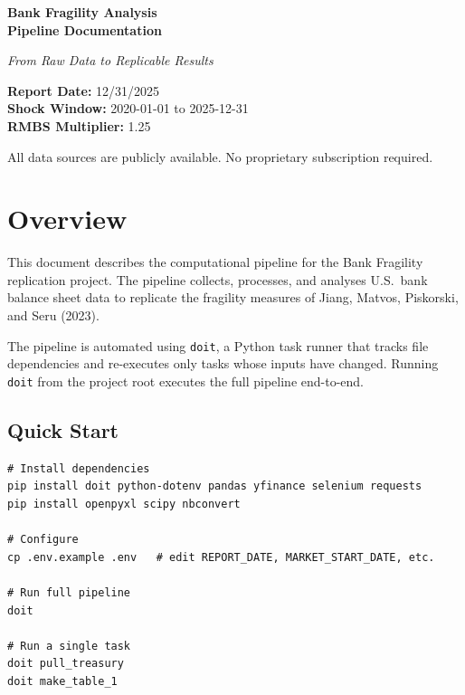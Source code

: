 \documentclass[12pt, a4paper]{article}
\begin{document}
\begin{titlepage}
    \centering
    \vspace*{2cm}
    {\LARGE\bfseries Bank Fragility Analysis\\[0.4em]
    Pipeline Documentation \par}
    \vspace{1cm}
    {\large\itshape From Raw Data to Replicable Results \par}
    \vspace{2cm}
    {\normalsize
    \textbf{Report Date:} 12/31/2025 \\[0.4em]
    \textbf{Shock Window:} 2020-01-01 to 2025-12-31 \\[0.4em]
    \textbf{RMBS Multiplier:} 1.25
    \par}
    \vfill
    {\small All data sources are publicly available. No proprietary
    subscription required.\par}
\end{titlepage}

\tableofcontents
\newpage

\section{Overview}

This document describes the computational pipeline for the Bank Fragility
replication project. The pipeline collects, processes, and analyses U.S.\ bank
balance sheet data to replicate the fragility measures of Jiang, Matvos,
Piskorski, and Seru (2023).

The pipeline is automated using \texttt{doit}, a Python task runner that tracks
file dependencies and re-executes only tasks whose inputs have changed. Running
\texttt{doit} from the project root executes the full pipeline end-to-end.

\subsection*{Quick Start}

\begin{lstlisting}
# Install dependencies
pip install doit python-dotenv pandas yfinance selenium requests
pip install openpyxl scipy nbconvert

# Configure
cp .env.example .env   # edit REPORT_DATE, MARKET_START_DATE, etc.

# Run full pipeline
doit

# Run a single task
doit pull_treasury
doit make_table_1
\end{lstlisting}
\end{document}
